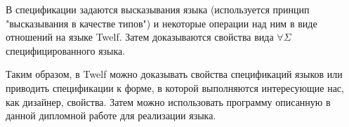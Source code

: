В спецификации задаются высказывания языка (используется принцип "высказывания в качестве типов"\cite{harper:1993}) и некоторые операции над ним в виде отношений на языке Twelf. Затем доказываются свойства вида  $\forall\Sigma$ специфицированного языка.

Таким образом, в Twelf можно доказывать свойства спецификаций языков или приводить спецификации к форме, в которой выполняются интересующие нас, как дизайнер, свойства. Затем можно использовать программу описанную в данной дипломной работе для реализации языка.






